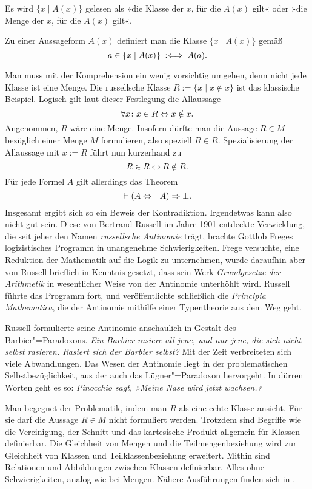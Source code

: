 Es wird $\{x\mid A(x)\}$ gelesen als »die Klasse der $x$, für die
$A(x)$ gilt« oder »die Menge der $x$, für die $A(x)$ gilt«.
\begin{Definition}[Komprehension]\label{def:Komprehension}\newlinefirst
Zu einer Aussageform $A(x)$ definiert man die Klasse
$\{x\mid A(x)\}$ gemäß
\[a\in\{x\mid A(x)\}\;:\Longleftrightarrow\; A(a).\]
\end{Definition}
Man muss mit der Komprehension ein wenig vorsichtig umgehen, denn nicht
jede Klasse ist eine Menge. Die russellsche Klasse $R := \{x\mid x\notin x\}$
ist das klassische Beispiel. Logisch gilt laut dieser Festlegung die
Allaussage
\[\forall x\colon x\in R\Leftrightarrow x\notin x.\]
Angenommen, $R$ wäre eine Menge. Insofern dürfte man die Aussage
$R\in M$ bezüglich einer Menge $M$ formulieren, also speziell $R\in R$.
Spezialisierung der Allaussage mit $x:=R$ führt nun kurzerhand zu
\[R\in R\Leftrightarrow R\notin R.\]
Für jede Formel $A$ gilt allerdings das Theorem
\[\vdash (A\Leftrightarrow\lnot A)\Rightarrow\bot.\]
Insgesamt ergibt sich so ein Beweis der Kontradiktion. Irgendetwas kann
also nicht gut sein. Diese von Bertrand Russell im Jahre 1901 entdeckte
Verwicklung, die seit jeher den Namen \emph{russellsche Antinomie}%
 trägt, brachte Gottlob Freges
logizistisches Programm in unangenehme Schwierigkeiten. Frege versuchte,
eine Reduktion der Mathematik auf die Logik zu unternehmen, wurde
daraufhin aber von Russell brieflich in Kenntnis gesetzt, dass sein
Werk \emph{Grundgesetze der Arithmetik} in wesentlicher Weise von der
Antinomie unterhöhlt wird. Russell führte das Programm fort, und
veröffentlichte schließlich die \emph{Principia Mathematica}, die der
Antinomie mithilfe einer Typentheorie aus dem Weg geht.

Russell formulierte seine Antinomie anschaulich in Gestalt des
Barbier"=Paradoxons. \emph{Ein Barbier rasiere all jene, und nur jene, die
sich nicht selbst rasieren. Rasiert sich der Barbier selbst?}
Mit der Zeit verbreiteten sich viele Abwandlungen. Das Wesen der
Antinomie liegt in der problematischen Selbstbezüglichkeit, aus der
auch das Lügner"=Paradoxon hervorgeht. In dürren Worten geht es so:
\emph{Pinocchio sagt, »Meine Nase wird jetzt wachsen.«}

Man begegnet der Problematik, indem man $R$ als eine echte
Klasse ansieht. Für sie darf die Aussage $R\in M$ nicht formuliert
werden. Trotzdem sind Begriffe wie die Vereinigung, der Schnitt
und das kartesische Produkt allgemein für Klassen definierbar.
Die Gleichheit von Mengen und die Teilmengenbeziehung wird zur
Gleichheit von Klassen und Teilklassenbeziehung erweitert. Mithin
sind Relationen und Abbildungen zwischen Klassen definierbar. Alles
ohne Schwierigkeiten, analog wie bei Mengen. Nähere Ausführungen finden
sich in \cite{Jech}.

